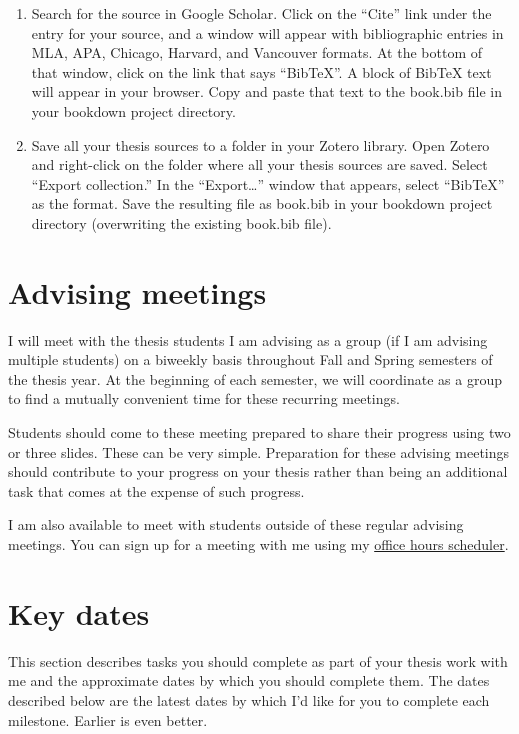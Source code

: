 \documentclass[]{tufte-book}
\begin{document}
\begin{enumerate}
\def\labelenumi{\arabic{enumi}.}
\item
  Search for the source in Google Scholar. Click on the ``Cite'' link under the entry for your source, and a window will appear with bibliographic entries in MLA, APA, Chicago, Harvard, and Vancouver formats. At the bottom of that window, click on the link that says ``BibTeX''. A block of BibTeX text will appear in your browser. Copy and paste that text to the book.bib file in your bookdown project directory.
\item
  Save all your thesis sources to a folder in your Zotero library. Open Zotero and right-click on the folder where all your thesis sources are saved. Select ``Export collection.'' In the ``Export\ldots{}'' window that appears, select ``BibTeX'' as the format. Save the resulting file as book.bib in your bookdown project directory (overwriting the existing book.bib file).
\end{enumerate}

\hypertarget{advising-meetings}{%
\chapter{Advising meetings}\label{advising-meetings}}

I will meet with the thesis students I am advising as a group (if I am advising multiple students) on a biweekly basis throughout Fall and Spring semesters of the thesis year. At the beginning of each semester, we will coordinate as a group to find a mutually convenient time for these recurring meetings.

Students should come to these meeting prepared to share their progress using two or three slides. These can be very simple. Preparation for these advising meetings should contribute to your progress on your thesis rather than being an additional task that comes at the expense of such progress.

I am also available to meet with students outside of these regular advising meetings. You can sign up for a meeting with me using my \href{https://carole-voulgaris.youcanbook.me/}{office hours scheduler}.

\hypertarget{key-dates}{%
\chapter{Key dates}\label{key-dates}}

This section describes tasks you should complete as part of your thesis work with me and the approximate dates by which you should complete them. The dates described below are the latest dates by which I'd like for you to complete each milestone. Earlier is even better.
\end{document}
